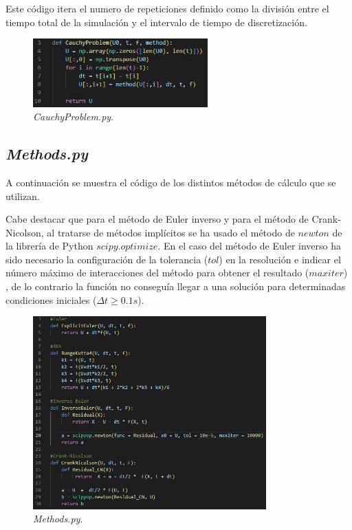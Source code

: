 \documentclass[12pt,a4paper]{article}
\begin{document}
Este código itera el numero de repeticiones definido como la división entre el tiempo total de la simulación y el intervalo de tiempo de discretización.
\begin{figure}[H] 
	\centering
	\includegraphics[width=0.6\textwidth]{FIGURES/Codigo/CauchyProblem.jpg}
	\caption{\textit{CauchyProblem.py}.}
\end{figure}

\subsection{\textit{Methods.py}}
A continuación se muestra el código de los distintos métodos de cálculo que se utilizan. 

Cabe destacar que para el método de Euler inverso y para el método de Crank-Nicolson, al tratarse de métodos implícitos se ha usado el método de $newton$ de la librería de Python $scipy.optimize$. En el caso del método de Euler inverso ha sido necesario la configuración de la tolerancia ($tol$) en la resolución e indicar el número máximo de interacciones del método para obtener el resultado ($maxiter$) , de lo contrario la función no conseguía llegar a una solución para determinadas condiciones iniciales ($\Delta t \geq 0.1 s$).
\begin{figure}[H] 
	\centering
	\includegraphics[width=0.8\textwidth]{FIGURES/Codigo/methods.jpg}
	\caption{\textit{Methods.py}.}
\end{figure}
\end{document}
